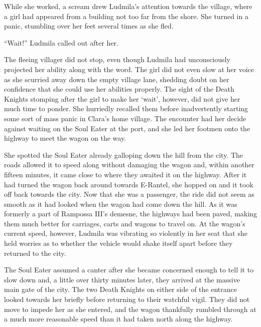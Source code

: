  

While she worked, a scream drew Ludmila’s attention towards the village, where a girl had appeared from a building not too far from the shore. She turned in a panic, stumbling over her feet several times as she fled.

 

“Wait!” Ludmila called out after her.

 

The fleeing villager did not stop, even though Ludmila had unconsciously projected her ability along with the word. The girl did not even slow at her voice as she scurried away down the empty village lane, shedding doubt on her confidence that she could use her abilities properly. The sight of the Death Knights stomping after the girl to make her ‘wait’, however, did not give her much time to ponder. She hurriedly recalled them before inadvertently starting some sort of mass panic in Clara’s home village. The encounter had her decide against waiting on the Soul Eater at the port, and she led her footmen onto the highway to meet the wagon on the way.

 

She spotted the Soul Eater already galloping down the hill from the city. The roads allowed it to speed along without damaging the wagon and, within another fifteen minutes, it came close to where they awaited it on the highway. After it had turned the wagon back around towards E-Rantel, she hopped on and it took off back towards the city. Now that she was a passenger, the ride did not seem as smooth as it had looked when the wagon had come down the hill. As it was formerly a part of Rampossa III’s demesne, the highways had been paved, making them much better for carriages, carts and wagons to travel on. At the wagon’s current speed, however, Ludmila was vibrating so violently in her seat that she held worries as to whether the vehicle would shake itself apart before they returned to the city.

 

The Soul Eater assumed a canter after she became concerned enough to tell it to slow down and, a little over thirty minutes later, they arrived at the massive main gate of the city. The two Death Knights on either side of the entrance looked towards her briefly before returning to their watchful vigil. They did not move to impede her as she entered, and the wagon thankfully rumbled through at a much more reasonable speed than it had taken north along the highway.

